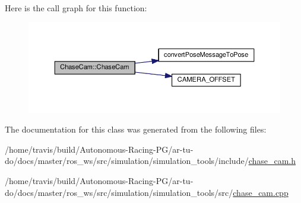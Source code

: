 Here is the call graph for this function\+:
\nopagebreak
\begin{figure}[H]
\begin{center}
\leavevmode
\includegraphics[width=350pt]{class_chase_cam_acaf9b819000bb346ebd85aa372782295_cgraph}
\end{center}
\end{figure}




The documentation for this class was generated from the following files\+:\begin{DoxyCompactItemize}
\item 
/home/travis/build/\+Autonomous-\/\+Racing-\/\+P\+G/ar-\/tu-\/do/docs/master/ros\+\_\+ws/src/simulation/simulation\+\_\+tools/include/\hyperlink{chase__cam_8h}{chase\+\_\+cam.\+h}\item 
/home/travis/build/\+Autonomous-\/\+Racing-\/\+P\+G/ar-\/tu-\/do/docs/master/ros\+\_\+ws/src/simulation/simulation\+\_\+tools/src/\hyperlink{chase__cam_8cpp}{chase\+\_\+cam.\+cpp}\end{DoxyCompactItemize}
